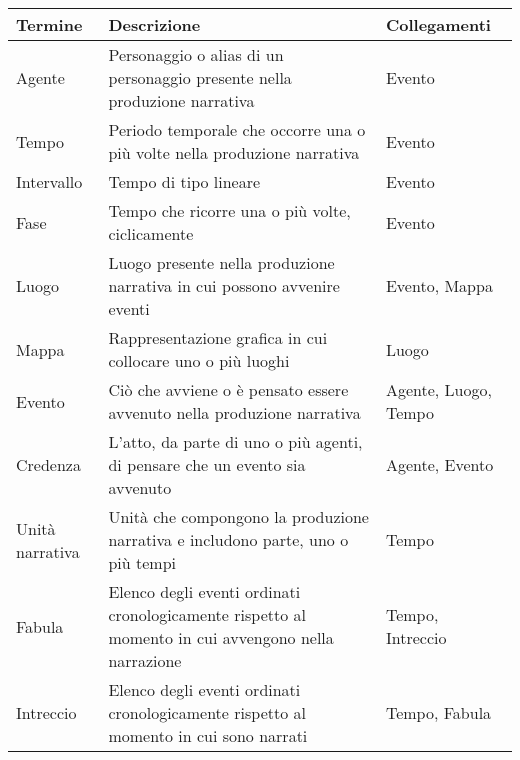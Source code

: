 \documentclass{article}
\begin{document}
\begin{center}\begin{tabular}{|p{}|p{}|p{}|}
		\hline
		\textbf{Termine} & \textbf{Descrizione}                                                                                & \textbf{Collegamenti} \\
		\hline
		Agente           & Personaggio o alias di un personaggio presente nella produzione narrativa                           & Evento                \\
		\hline
		Tempo            & Periodo temporale che occorre una o più volte nella produzione narrativa                            & Evento                \\
		\hline
		Intervallo       & Tempo di tipo lineare                                                                               & Evento                \\
		\hline
		Fase             & Tempo che ricorre una o più volte, ciclicamente                                                     & Evento                \\
		\hline
		Luogo            & Luogo presente nella produzione narrativa in cui possono avvenire eventi                            & Evento, Mappa         \\
		\hline
		Mappa            & Rappresentazione grafica in cui collocare uno o più luoghi                                          & Luogo                 \\
		\hline
		Evento           & Ciò che avviene o è pensato essere avvenuto nella produzione narrativa                              & Agente, Luogo, Tempo  \\
		\hline
		Credenza         & L'atto, da parte di uno o più agenti, di pensare che un evento sia avvenuto                         & Agente, Evento        \\
		\hline
		Unità narrativa  & Unità che compongono la produzione narrativa e includono parte, uno o più tempi                     & Tempo                 \\
		\hline
		Fabula           & Elenco degli eventi ordinati cronologicamente rispetto al momento in cui avvengono nella narrazione & Tempo, Intreccio      \\
		\hline
		Intreccio        & Elenco degli eventi ordinati cronologicamente rispetto al momento in cui sono narrati               & Tempo, Fabula         \\
		\hline
	\end{tabular}\end{center}
\end{document}
